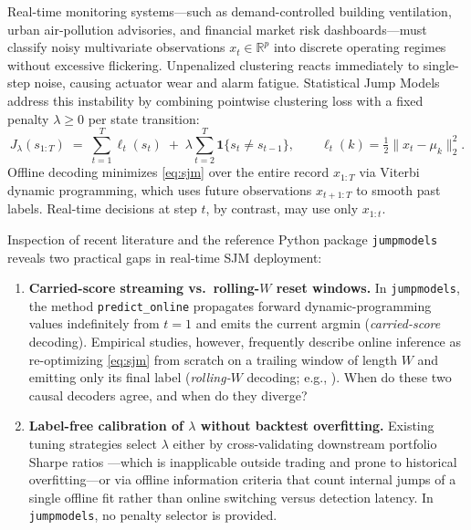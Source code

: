 \documentclass[11pt]{article}
\newcommand{\ind}{\mathbf{1}}
\begin{document}
Real-time monitoring systems---such as demand-controlled building ventilation, urban air-pollution advisories, and financial market risk dashboards---must classify noisy multivariate observations $x_t \in \mathbb{R}^p$ into discrete operating regimes without excessive flickering. Unpenalized clustering reacts immediately to single-step noise, causing actuator wear and alarm fatigue. Statistical Jump Models \cite{bemporad2018,nystrup2020} address this instability by combining pointwise clustering loss with a fixed penalty $\lambda \ge 0$ per state transition:
\begin{equation}
  J_\lambda(s_{1:T}) \;=\; \sum_{t=1}^{T} \ell_t(s_t) \;+\; \lambda \sum_{t=2}^{T} \ind\{s_t \ne s_{t-1}\},
  \qquad \ell_t(k) = \tfrac{1}{2}\|x_t - \mu_k\|_2^2.
  \label{eq:sjm}
\end{equation}
Offline decoding minimizes \eqref{eq:sjm} over the entire record $x_{1:T}$ via Viterbi dynamic programming, which uses future observations $x_{t+1:T}$ to smooth past labels. Real-time decisions at step $t$, by contrast, may use only $x_{1:t}$.

Inspection of recent literature and the reference Python package \texttt{jumpmodels} \cite{shu2024} reveals two practical gaps in real-time SJM deployment:
\begin{enumerate}
  \item \textbf{Carried-score streaming vs.\ rolling-$W$ reset windows.} In \texttt{jumpmodels}, the method \texttt{predict\_online} propagates forward dynamic-programming values indefinitely from $t = 1$ and emits the current argmin (\emph{carried-score} decoding). Empirical studies, however, frequently describe online inference as re-optimizing \eqref{eq:sjm} from scratch on a trailing window of length $W$ and emitting only its final label (\emph{rolling-$W$} decoding; e.g., \cite[Sec.~3.4.2]{shu2024}). When do these two causal decoders agree, and when do they diverge?
  \item \textbf{Label-free calibration of $\lambda$ without backtest overfitting.} Existing tuning strategies select $\lambda$ either by cross-validating downstream portfolio Sharpe ratios \cite{nystrup2020,shu2024}---which is inapplicable outside trading and prone to historical overfitting---or via offline information criteria \cite{cortese2026} that count internal jumps of a single offline fit rather than online switching versus detection latency. In \texttt{jumpmodels}, no penalty selector is provided.
\end{enumerate}
\end{document}
